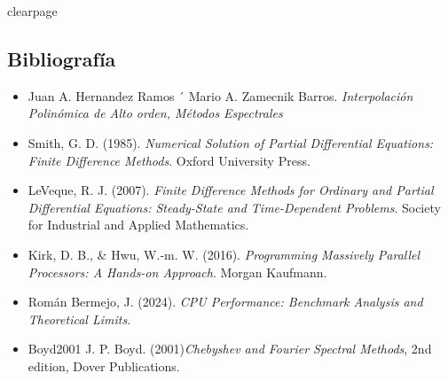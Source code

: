 clearpage

\subsection{Bibliografía}

\begin{itemize}
    \item Juan A. Hernandez Ramos ´
Mario A. Zamecnik Barros. \textit{Interpolación Polinómica de Alto orden, Métodos Espectrales}
    \item Smith, G. D. (1985). \textit{Numerical Solution of Partial Differential Equations: Finite Difference Methods}. Oxford University Press.
    \item LeVeque, R. J. (2007). \textit{Finite Difference Methods for Ordinary and Partial Differential Equations: Steady-State and Time-Dependent Problems}. Society for Industrial and Applied Mathematics.
    \item Kirk, D. B., \& Hwu, W.-m. W. (2016). \textit{Programming Massively Parallel Processors: A Hands-on Approach}. Morgan Kaufmann.
    \item Román Bermejo, J. (2024). \textit{CPU Performance: Benchmark Analysis and Theoretical Limits}.
    \item{Boyd2001}
J. P. Boyd. (2001)\textit{Chebyshev and Fourier Spectral Methods}, 2nd edition, Dover Publications.

 
\end{itemize}